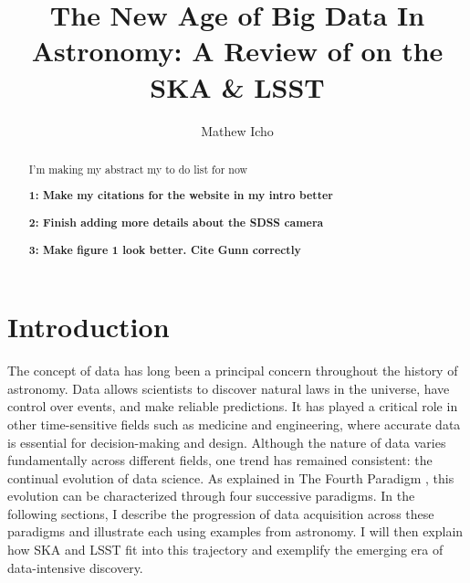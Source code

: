 \documentclass[preprint,linenumbers, longauthor]{aastex631}
\begin{document}
\title{The New Age of Big Data In Astronomy: A Review of on the SKA \& LSST}
\author{Mathew Icho}

\begin{abstract}
I'm making my abstract my to do list for now

\textbf{1: Make my citations for the website in my intro better}

\textbf{2: Finish adding more details about the SDSS camera}

\textbf{3: Make figure 1 look better. Cite Gunn correctly}
\end{abstract}

\tableofcontents

\section{Introduction}
The concept of data has long been a principal concern throughout the history of astronomy. Data allows scientists to discover natural laws in the universe, have control over events, and make reliable predictions. It has played a critical role in other time-sensitive fields such as medicine and engineering, where accurate data is essential for decision-making and design. Although the nature of data varies fundamentally across different fields, one trend has remained consistent: the continual evolution of data science. As explained in The Fourth Paradigm \citep{heyFourthParadigmDataIntensive2009}, this evolution can be characterized through four successive paradigms. In the following sections, I describe the progression of data acquisition across these paradigms and illustrate each using examples from astronomy. I will then explain how SKA and LSST fit into this trajectory and exemplify the emerging era of data-intensive discovery.
\end{document}
